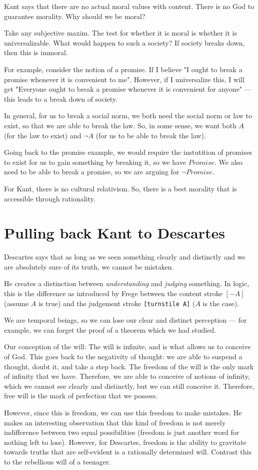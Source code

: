 \documentclass[11pt]{book}
\begin{document}
Kant says that there are no actual moral values with content.
There is no God to guarantee morality.
Why should we be moral?

Take any subjective maxim. The test for whether it is moral is whether
it is universalizable. What would happen to such a society? If society
breaks down, then this is immoral.

For example, consider the notion of a promise. If I believe "I ought
to break a promise whenever it is convenient to me". However, if I
universalize this, I will get "Everyone ought to break a promise
whenever it is convenient for anyone" --- this leads to a break down
of society.

In general, for us to break a social norm, we both need the social norm
or law to exist, so that we are able to break the law. So, in some sense,
we want both $A$ (for the law to exist) and ${\lnot A}$
(for us to be able to break the law).

Going back to the promise example, we would require the instutition of promises
to exist for us to gain something by breaking it, so we have $Promise$. We also need
to be able to break a promise, so we are arguing for $\lnot Promise$.

For Kant, there is no cultural relativism. So, there is a best morality that is
accessible through rationality.

\section{Pulling back Kant to Descartes}

Descartes says that as long as we seen something clearly and distinctly and we
are absolutely sure of its truth, we cannot be mistaken. 

He creates a distinction between \emph{understanding} and \emph{judging}
something. In logic, this is the difference as introduced by Frege between the
content stroke $[- A]$(assume $A$ is true) and  the judgement stroke \texttt{[turnstile A]}
($A$ is the case).

We are temporal beings, so we can lose our clear and distinct perception --- for example,
we can forget the proof of a theorem which we had studied.

Our conception of the will: The will is infinite, and is what allows us to conceive of God.
This goes back to the negativity of thought: we are able to suspend a thought,
doubt it, and take a step back. The freedom of the will is the only mark of infinity
that we have. Therefore, we are able to conceive of notions of infinity, which we cannot
see clearly and distinctly, but we can still conceive it. Therefore, free will is
the mark of perfection that we possess. 

However, since this is freedom, we can use this freedom to make mistakes.
He makes an interesting observation that this kind of freedom is not merely indifference
between two equal possibilities (freedom is just another word for nothing left to lose).
However, for Descartes, freedom is the ability to gravitate towards truths that
are self-evident is a rationally determined will. Contrast this to the rebellious
will of a teenager.
\end{document}
